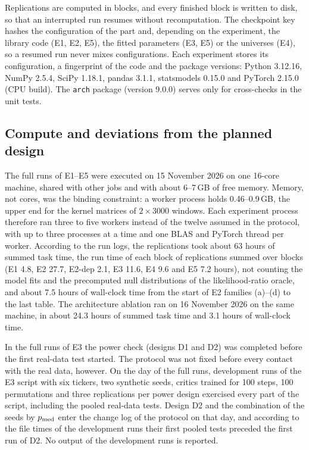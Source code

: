Replications are computed in blocks, and every finished block is written to disk, so that an
interrupted run resumes without recomputation. The checkpoint key hashes the configuration of
the part and, depending on the experiment, the library code (E1, E2, E5), the fitted parameters
(E3, E5) or the universes (E4), so a resumed run never mixes configurations. Each experiment
stores its configuration, a fingerprint of the code and the package versions: Python 3.12.16,
NumPy 2.5.4, SciPy 1.18.1, pandas 3.1.1, statsmodels 0.15.0 and PyTorch 2.15.0 (CPU build).
The \texttt{arch} package (version 9.0.0) serves only for cross-checks in the unit tests.

\subsection{Compute and deviations from the planned design}\label{app:impl-compute}

The full runs of E1--E5 were executed on 15 November 2026 on one 16-core machine, shared with
other jobs and with about 6--7\,GB of free memory. Memory, not cores, was the binding
constraint: a worker process holds 0.46--0.9\,GB, the upper end for the kernel matrices of
$2\times3000$ windows. Each experiment process therefore ran three to five workers instead of
the twelve assumed in the protocol, with up to three processes at a time and one BLAS and
PyTorch thread per worker. According to the run logs, the replications took about 63 hours of
summed task time, the run time of each block of replications summed over blocks (E1 4.8, E2
27.7, E2-dep 2.1, E3 11.6, E4 9.6 and E5 7.2 hours), not
counting the model fits and the precomputed null distributions of the likelihood-ratio oracle,
and about 7.5 hours of wall-clock time from the start of E2 families (a)--(d) to the last table.
The architecture ablation ran on 16 November 2026 on the same machine, in about 24.3 hours of
summed task time and 3.1 hours of wall-clock time.

In the full runs of E3 the power check (designs D1 and D2) was completed before the first
real-data test started. The protocol was not fixed before every contact with the real data,
however. On the day of the full runs, development runs of the E3 script with six tickers, two
synthetic seeds, critics trained for 100 steps, 100 permutations and three replications per
power design exercised every part of the script, including the pooled real-data tests. Design
D2 and the combination of the seeds by $p_{\mathrm{med}}$ enter the change log of the protocol on that day,
and according to the file times of the development runs their first pooled tests preceded the
first run of D2. No output of the development runs is reported.

